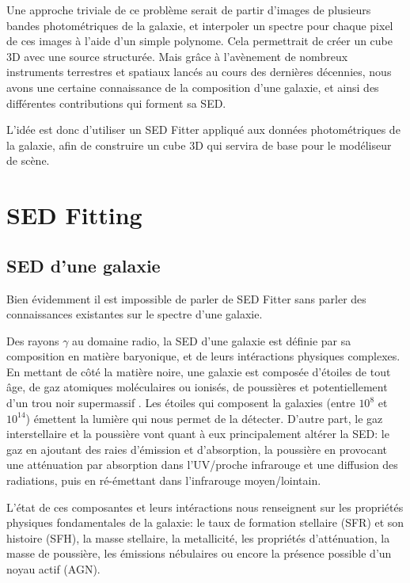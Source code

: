 \documentclass[../main/main.tex]{subfiles}
\begin{document}
Une approche triviale de ce problème serait de partir d'images de
plusieurs bandes
photométriques de la galaxie, et interpoler un spectre pour chaque pixel
de ces images à l'aide d'un
simple polynome. Cela permettrait de créer un cube 3D avec une source structurée.
Mais grâce à l'avènement de nombreux instruments terrestres et spatiaux
lancés au cours des dernières décennies, nous avons une certaine
connaissance de la composition d'une galaxie, et ainsi des différentes
contributions qui forment sa SED.

L'idée est donc d'utiliser un SED Fitter appliqué aux données
photométriques de la galaxie, afin de construire un cube 3D qui servira de base pour le modéliseur de scène.

\section{SED Fitting}\label{sec:sedfitting}
\subsection{SED d'une galaxie}

Bien évidemment il est impossible de parler de SED Fitter sans parler
des connaissances existantes sur le spectre d'une galaxie.

Des rayons $\gamma$ au domaine radio, la SED d'une galaxie est définie par sa composition en matière
baryonique, et de leurs intéractions physiques complexes. En mettant de côté la matière
noire, une galaxie est composée d'étoiles de tout âge, de gaz atomiques
moléculaires ou ionisés, de poussières et
potentiellement d'un trou noir supermassif \citep{Kormendy}. Les étoiles
qui composent la galaxies (entre $10^{8}$ et $10^{14}$) émettent la
lumière qui nous permet de la détecter. D'autre part, le gaz interstellaire
et la poussière vont quant à eux principalement altérer la SED: le gaz en ajoutant des raies
d'émission et d'absorption, la poussière en provocant une atténuation par
absorption dans l'UV/proche infrarouge et une diffusion des radiations, puis en
ré-émettant dans l'infrarouge moyen/lointain.

L'état de ces composantes et
leurs intéractions nous renseignent sur les propriétés physiques fondamentales
de la galaxie: le taux de formation stellaire (SFR) et son histoire
(SFH), la masse stellaire, la metallicité, les propriétés d'atténuation, la masse de
poussière, les émissions nébulaires ou encore la présence possible d'un noyau actif (AGN). 
\end{document}
